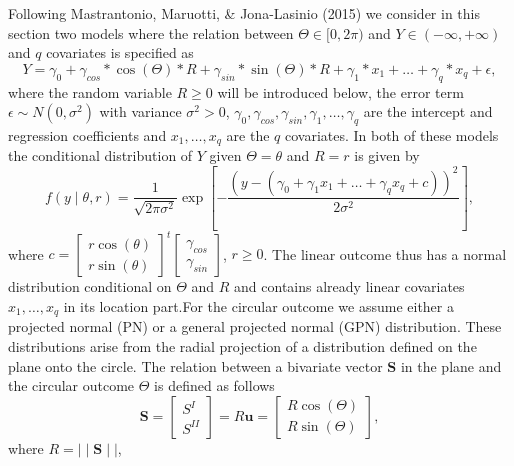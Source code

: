 \documentclass[12pt,]{article}
\begin{document}
Following Mastrantonio, Maruotti, \& Jona-Lasinio (2015) we consider in
this section two models where the relation between
\(\Theta \in [0, 2\pi)\) and \(Y\in (-\infty, + \infty)\) and \(q\)
covariates is specified as \begin{equation}\label{circlinlink}
Y = \gamma_0 + \gamma_{cos}*\cos(\Theta)*R + \gamma_{sin}*\sin(\Theta)*R + \gamma_1*x_1 + \dots + \gamma_q*x_q +  \epsilon,
\end{equation} \noindent where the random variable \(R\geq0\) will be
introduced below, the error term \(\epsilon \sim N(0, \sigma^2)\) with
variance \(\sigma^2>0\),
\(\gamma_0, \gamma_{cos}, \gamma_{sin}, \gamma_1, \dots, \gamma_q\) are
the intercept and regression coefficients and \(x_1, \dots, x_q\) are
the \(q\) covariates. In both of these models the conditional
distribution of \(Y\) given \(\Theta=\theta\) and \(R = r\) is given by
\begin{equation}\label{ycondtheta}
f(y \mid \theta, r) = \frac{1}{\sqrt{2\pi\sigma^2}}\exp\left[-\frac{(y - (\gamma_0 + \gamma_1x_1 + \dots + \gamma_qx_q+c))^{2}}{2\sigma^2}\right],\nonumber
\end{equation} \noindent where
\(c = \begin{bmatrix} r \cos(\theta) \\ r\sin(\theta) \end{bmatrix}^t \begin{bmatrix} \gamma_{cos} \\ \gamma_{sin} \end{bmatrix}\),
\(r \geq 0\). The linear outcome thus has a normal distribution
conditional on \(\Theta\) and \(R\) and contains already linear
covariates \(x_1, \dots, x_q\) in its location part.\newline \indent For
the circular outcome we assume either a projected normal (PN) or a
general projected normal (GPN) distribution. These distributions arise
from the radial projection of a distribution defined on the plane onto
the circle. The relation between a bivariate vector \(\boldsymbol{S}\)
in the plane and the circular outcome \(\Theta\) is defined as follows
\begin{equation}\label{projection}
\boldsymbol{S} = \begin{bmatrix} S^{I} \\ S^{II} \end{bmatrix} = R\boldsymbol{u} = \begin{bmatrix} R \cos (\Theta) \\  R\sin (\Theta) \end{bmatrix},
\end{equation} \noindent where \(R = \mid\mid \boldsymbol{S} \mid\mid\),
\end{document}

